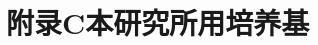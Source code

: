 \chapter{附录C\quad 本研究所用培养基}
\renewcommand{\leftmark}{附录C\quad 本研究所用培养基}
\setcounter{chapter}{3}
\setcounter{figure}{0}
\setcounter{table}{0}

\blindtext

\blindtext

\blindtext